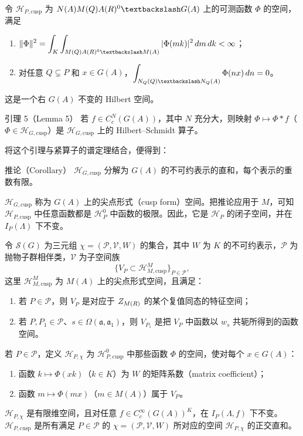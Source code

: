 令 $\mathcal H_{P,\mathrm{cusp}}$ 为
$N(A)M(\Q)A(\R)^0\backslash G(A)$ 上的可测函数 $\Phi$ 的空间，满足
\begin{enumerate}
\item[(i)] $\displaystyle\|\Phi\|^2=\int_K\int_{M(\Q)A(\R)^0\backslash M(A)}|\Phi(mk)|^2\,dm\,dk<\infty$；
\item[(ii)] 对任意 $Q\subsetneq P$ 和 $x\in G(A)$，$\displaystyle\int_{N_Q(\Q)\backslash N_Q(A)}\Phi(nx)\,dn=0$。
\end{enumerate}
这是一个右 $G(A)$ 不变的 Hilbert 空间。
\begin{originaltheorem}{引理 5（Lemma 5）}
若 $f\in C_c^N(G(A))$，其中 $N$ 充分大，则映射 $\Phi\mapsto\Phi*f$（$\Phi\in\mathcal H_{G,\mathrm{cusp}}$）是 $\mathcal H_{G,\mathrm{cusp}}$ 上的 Hilbert--Schmidt 算子。
\end{originaltheorem}

将这个引理与紧算子的谱定理结合，便得到：
\begin{originaltheorem}{推论（Corollary）}
$\mathcal H_{G,\mathrm{cusp}}$ 分解为 $G(A)$ 的不可约表示的直和，每个表示的重数有限。
\end{originaltheorem}
$\mathcal H_{G,\mathrm{cusp}}$ 称为 $G(A)$ 上的尖点形式（cusp form）空间。把推论应用于 $M$，可知 $\mathcal H_{P,\mathrm{cusp}}$ 中任意函数都是 $\mathcal H_P^0$ 中函数的极限。因此，它是 $\mathcal H_P$ 的闭子空间，并在 $I_P(\Lambda)$ 下不变。

令 $\mathcal S(G)$ 为三元组 $\chi=(\mathcal P,\mathcal V,W)$ 的集合，其中 $W$ 为 $K$ 的不可约表示，$\mathcal P$ 为抛物子群相伴类，$\mathcal V$ 为子空间族
\[
 \{V_P\subset\mathcal H_{M,\mathrm{cusp}}^M\}_{P\in\mathcal P},
\]
这里 $\mathcal H_{M,\mathrm{cusp}}^M$ 为 $M(A)$ 上的尖点形式空间，且满足：
\begin{enumerate}
\item[(i)] 若 $P\in\mathcal P$，则 $V_P$ 是对应于 $Z_{M(R)}$ 的某个复值同态的特征空间；
\item[(ii)] 若 $P,P_1\in\mathcal P$、$s\in\Omega(\mathfrak a,\mathfrak a_1)$，则 $V_{P_1}$ 是把 $V_P$ 中函数以 $w_s$ 共轭所得到的函数空间。
\end{enumerate}
若 $P\in\mathcal P$，定义 $\mathcal H_{P,\chi}$ 为 $\mathcal H_{P,\mathrm{cusp}}^0$ 中那些函数 $\Phi$ 的空间，使对每个 $x\in G(A)$：
\begin{enumerate}
\item[(i)] 函数 $k\mapsto\Phi(xk)$（$k\in K$）为 $W$ 的矩阵系数（matrix coefficient）；
\item[(ii)] 函数 $m\mapsto\Phi(mx)$（$m\in M(A)$）属于 $V_P$。
\end{enumerate}
$\mathcal H_{P,\chi}$ 是有限维空间，且对任意 $f\in C_c^\infty(G(A))^K$，在 $I_P(\Lambda,f)$ 下不变。$\mathcal H_{P,\mathrm{cusp}}$ 是所有满足 $P\in\mathcal P$ 的 $\chi=(\mathcal P,\mathcal V,W)$ 所对应的空间 $\mathcal H_{P,\chi}$ 的正交直和。

